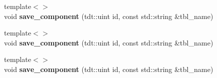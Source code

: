 \begin{DoxyCompactItemize}
\item 
{\footnotesize template$<$$>$ }\\void {\bfseries save\+\_\+component} (tdt\+::uint id, const std\+::string \&tbl\+\_\+name)\hypertarget{class_game_serializer_a2b8f301421ab3d3df49c1b3537ab3b96}{}\label{class_game_serializer_a2b8f301421ab3d3df49c1b3537ab3b96}

\item 
{\footnotesize template$<$$>$ }\\void {\bfseries save\+\_\+component} (tdt\+::uint id, const std\+::string \&tbl\+\_\+name)\hypertarget{class_game_serializer_a2b8f301421ab3d3df49c1b3537ab3b96}{}\label{class_game_serializer_a2b8f301421ab3d3df49c1b3537ab3b96}

\item 
{\footnotesize template$<$$>$ }\\void {\bfseries save\+\_\+component} (tdt\+::uint id, const std\+::string \&tbl\+\_\+name)\hypertarget{class_game_serializer_a2b8f301421ab3d3df49c1b3537ab3b96}{}\label{class_game_serializer_a2b8f301421ab3d3df49c1b3537ab3b96}

\end{DoxyCompactItemize}
